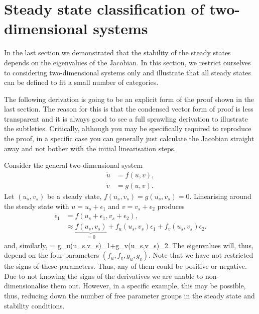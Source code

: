 \section{Steady state classification of two-dimensional systems}
In the last section we demonstrated that the stability of the steady states depends on the eigenvalues of the Jacobian. In this section, we restrict ourselves to considering two-dimensional systems only and illustrate that all steady states can be defined to fit a small number of categories.

The following derivation is going to be an explicit form of the proof shown in the last section. The reason for this is that the condensed vector form of proof is less transparent and it is always good to see a full sprawling derivation to illustrate the subtleties. Critically, although you may be specifically required to reproduce the proof, in a specific case you can generally just calculate the Jacobian straight away and not bother with the initial linearisation steps.

Consider the general two-dimensional system
\begin{align}
\dot{u}&=f(u,v),\\
\dot{v}&=g(u,v).
\end{align}
Let $(u_s,v_s)$ be a steady state, \ie $f(u_s,v_s)=g(u_s,v_s)=0$. Linearising around the steady state with $u=u_s+\epsilon_1$ and $v=v_s+\epsilon_2$ produces
\begin{align}
\dot{\epsilon_1}&= f(u_s+\epsilon_1,v_s+\epsilon_2),\nonumber\\
&\approx \underbrace{f(u_s,v_s)}_{=0}+f_u(u_s,v_s)\epsilon_1+f_v(u_s,v_s)\epsilon_2.\label{Two_d_f}
\end{align}
and, similarly,
\bb
{}= g_u(u_s,v_s)\epsilon_1+g_v(u_s,v_s)\epsilon_2.\label{Two_d_g}
\ee
The eigenvalues will, thus, depend on the four parameters $(f_u,f_v,g_u,g_v)$. Note that we have not restricted the signs of these parameters. Thus, any of them could be positive or negative. Due to not knowing the signs of the derivatives we are unable to non-dimensionalise them out. However, in a specific example, this may be possible, thus, reducing down the number of free parameter groups in the steady state and stability conditions.

